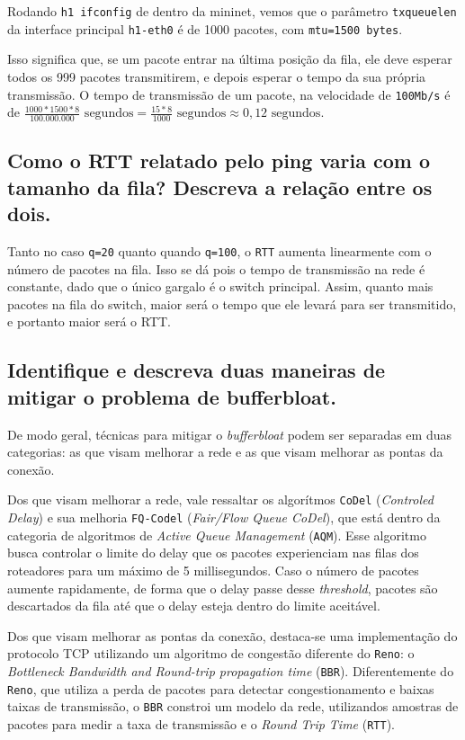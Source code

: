 \documentclass[a4paper,12pt]{article}
\newcommand{\code}[1]{\texttt{#1}}
\begin{document}
Rodando \code{h1 ifconfig} de dentro da mininet, vemos que o parâmetro \code{txqueuelen} da interface principal \code{h1-eth0} é de 1000 pacotes, com \code{mtu=1500 bytes}.

Isso significa que, se um pacote entrar na última posição da fila, ele deve esperar todos os 999 pacotes transmitirem, e depois esperar o tempo da sua própria transmissão. O tempo de transmissão de um pacote, na velocidade de \code{100Mb/s} é de $\frac{1000 * 1500 * 8}{100.000.000} \text{ segundos} = \frac{15 * 8}{1000} \text{ segundos} \approx 0,12 \text{ segundos} $. 

\subsection{Como o RTT relatado pelo ping varia com o tamanho da fila? Descreva a relação entre os dois.}

Tanto no caso \code{q=20} quanto quando \code{q=100}, o \code{RTT} aumenta linearmente com o número de pacotes na fila. Isso se dá pois o tempo de transmissão na rede é constante, dado que o único gargalo é o switch principal. Assim, quanto mais pacotes na fila do switch, maior será o tempo que ele levará para ser transmitido, e portanto maior será o RTT.

\subsection{Identifique e descreva duas maneiras de mitigar o problema de bufferbloat.}

De modo geral, técnicas para mitigar o \textit{bufferbloat} podem ser separadas em duas categorias: as que visam melhorar a rede e as que visam melhorar as pontas da conexão.

Dos que visam melhorar a rede, vale ressaltar os algorítmos \code{CoDel} (\textit{Controled Delay}) e sua melhoria \code{FQ-Codel} (\textit{Fair/Flow Queue CoDel}), que está dentro da categoria de algoritmos de \textit{Active Queue Management} (\code{AQM}). Esse algoritmo busca controlar o limite do delay que os pacotes experienciam nas filas dos roteadores para um máximo de 5 millisegundos. Caso o número de pacotes aumente rapidamente, de forma que o delay passe desse \textit{threshold}, pacotes são descartados da fila até que o delay esteja dentro do limite aceitável.

Dos que visam melhorar as pontas da conexão, destaca-se uma implementação do protocolo TCP utilizando um algoritmo de congestão diferente do \code{Reno}: o \textit{Bottleneck Bandwidth and Round-trip propagation time} (\code{BBR}). Diferentemente do \code{Reno}, que utiliza a perda de pacotes para detectar congestionamento e baixas taixas de transmissão, o \code{BBR} constroi um modelo da rede, utilizandos amostras de pacotes para medir a taxa de transmissão e o \textit{Round Trip Time} (\code{RTT}).

\end{document}
